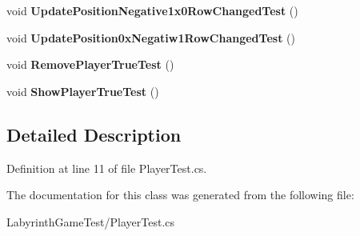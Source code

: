 \begin{DoxyCompactItemize}
\item 
\hypertarget{class_labyrinth_game_test_1_1_player_test_a8beac5b2440dd284e29fddb2a124f2a0}{void {\bfseries Update\+Position\+Negative1x0\+Row\+Changed\+Test} ()}\label{class_labyrinth_game_test_1_1_player_test_a8beac5b2440dd284e29fddb2a124f2a0}

\item 
\hypertarget{class_labyrinth_game_test_1_1_player_test_a4a9766783cbd139b2941b07f9448f1a0}{void {\bfseries Update\+Position0x\+Negatiw1\+Row\+Changed\+Test} ()}\label{class_labyrinth_game_test_1_1_player_test_a4a9766783cbd139b2941b07f9448f1a0}

\item 
\hypertarget{class_labyrinth_game_test_1_1_player_test_ae3b0910d2a59fcf1a17f62358ddfc047}{void {\bfseries Remove\+Player\+True\+Test} ()}\label{class_labyrinth_game_test_1_1_player_test_ae3b0910d2a59fcf1a17f62358ddfc047}

\item 
\hypertarget{class_labyrinth_game_test_1_1_player_test_a6fb3814e5e97a10c3928f85f2929b0e7}{void {\bfseries Show\+Player\+True\+Test} ()}\label{class_labyrinth_game_test_1_1_player_test_a6fb3814e5e97a10c3928f85f2929b0e7}

\end{DoxyCompactItemize}


\subsection{Detailed Description}


Definition at line 11 of file Player\+Test.\+cs.



The documentation for this class was generated from the following file\+:\begin{DoxyCompactItemize}
\item 
Labyrinth\+Game\+Test/Player\+Test.\+cs\end{DoxyCompactItemize}
